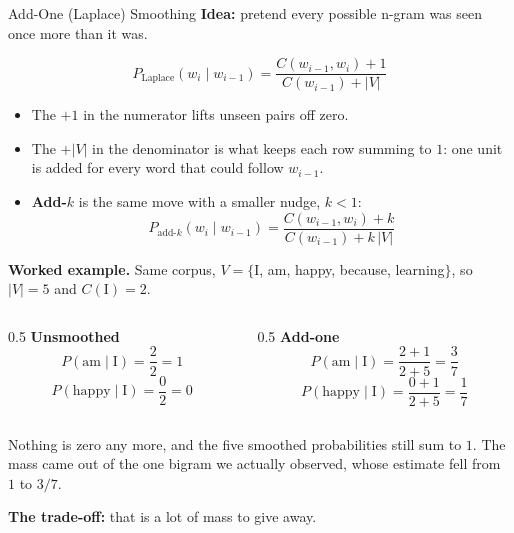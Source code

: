 \begin{frame}[allowframebreaks]{Add-One (Laplace) Smoothing}
    \textbf{Idea:} pretend every possible n-gram was seen once more than it was.

    \[
        P_{\text{Laplace}}(w_i \mid w_{i-1})
        = \frac{C(w_{i-1}, w_i) + 1}{C(w_{i-1}) + |V|}
    \]

    \begin{itemize}
        \item The $+1$ in the numerator lifts unseen pairs off zero.
        \item The $+|V|$ in the denominator is what keeps each row summing to $1$:
        one unit is added for every word that could follow $w_{i-1}$.
        \item \textbf{Add-$k$} is the same move with a smaller nudge, $k < 1$:
        \[
            P_{\text{add-}k}(w_i \mid w_{i-1})
            = \frac{C(w_{i-1}, w_i) + k}{C(w_{i-1}) + k\,|V|}
        \]
    \end{itemize}

\framebreak
    \textbf{Worked example.} Same corpus, $V = \{$I, am, happy, because, learning$\}$,
    so $|V| = 5$ and $C(\text{I}) = 2$.

    \vspace{0.5em}
    \begin{columns}[t]
        \begin{column}{0.5\textwidth}
            \textbf{Unsmoothed}
            \[ P(\text{am} \mid \text{I}) = \frac{2}{2} = 1 \]
            \[ P(\text{happy} \mid \text{I}) = \frac{0}{2} = 0 \]
        \end{column}
        \begin{column}{0.5\textwidth}
            \textbf{Add-one}
            \[ P(\text{am} \mid \text{I}) = \frac{2+1}{2+5} = \frac{3}{7} \]
            \[ P(\text{happy} \mid \text{I}) = \frac{0+1}{2+5} = \frac{1}{7} \]
        \end{column}
    \end{columns}

    \vspace{0.5em}
    Nothing is zero any more, and the five smoothed probabilities still sum to $1$.
    The mass came out of the one bigram we actually observed, whose estimate fell
    from $1$ to $3/7$.

\framebreak
    \textbf{The trade-off:} that is a lot of mass to give away.


\end{frame}
